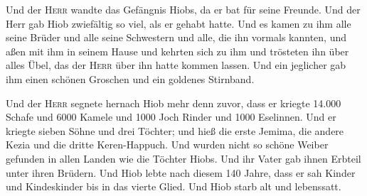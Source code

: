  Und der \textsc{Herr} wandte das Gefängnis Hiobs, da er
bat für seine Freunde. Und der Herr gab Hiob zwiefältig so viel, als er
gehabt hatte.  Und es kamen zu ihm alle seine Brüder und
alle seine Schwestern und alle, die ihn vormals kannten, und aßen mit
ihm in seinem Hause und kehrten sich zu ihm und trösteten ihn über alles
Übel, das der \textsc{Herr} über ihn hatte kommen lassen. Und ein
jeglicher gab ihm einen schönen Groschen und ein goldenes Stirnband.

 Und der \textsc{Herr} segnete hernach Hiob mehr denn
zuvor, dass er kriegte 14.000 Schafe und 6000 Kamele und 1000 Joch
Rinder und 1000 Eselinnen.  Und er kriegte sieben Söhne
und drei Töchter;  und hieß die erste Jemima, die andere
Kezia und die dritte Keren-Happuch.  Und wurden nicht so
schöne Weiber gefunden in allen Landen wie die Töchter Hiobs. Und ihr
Vater gab ihnen Erbteil unter ihren Brüdern.  Und Hiob
lebte nach diesem 140 Jahre, dass er sah Kinder und Kindeskinder bis in
das vierte Glied.  Und Hiob starb alt und lebenssatt.
